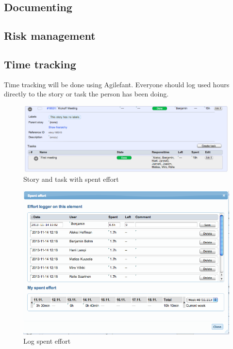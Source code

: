 \documentclass{report}
\begin{document}
\subsection{Documenting}

\subsection{Risk management}

\subsection{Time tracking}

Time tracking will be done using Agilefant. Everyone should log used hours directly to the story or task the person has been doing.

\begin{figure}[H]
\centering
\includegraphics[width=1\textwidth]{imgs/spenteffort1.png}
\caption{Story and task with spent effort}
\label{fig:spenteffort1}
\end{figure}


\begin{figure}[H]
\centering
\includegraphics[width=1\textwidth]{imgs/spenteffort2.png}
\caption{Log spent effort}
\label{fig:spenteffort2}
\end{figure}
\end{document}
